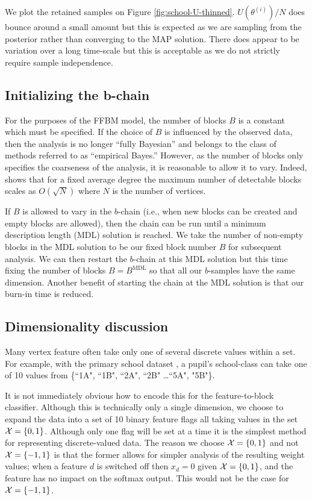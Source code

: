 We plot the retained samples on Figure \ref{fig:school-U-thinned}. $U(\theta^{(i)})/N$ does bounce around a small amount but this is expected as we are sampling from the posterior rather than converging to the MAP solution. There does appear to be variation over a long time-scale but this is acceptable as we do not strictly require sample independence.
\FloatBarrier
\subsection{Initializing the b-chain}

For the purposes of the FFBM model, the number of blocks $B$ is a constant 
which must be specified. If the choice of $B$ is influenced 
by the observed data, then the analysis is no longer ``fully Bayesian''
and belongs to the class of methods referred to as ``empirical Bayes.''
However, as the number of blocks only specifies the coarseness of the 
analysis, it is reasonable to allow it to vary. Indeed, 
\citet{peixoto-determine-B} shows that for a fixed 
average degree the maximum number of detectable blocks scales 
as $O(\sqrt{N})$ where $N$ is the number of vertices.

If $B$ is allowed to vary in the $b$-chain (i.e.,
when new blocks can be created and empty blocks are allowed),
then the chain can be run until a minimum description 
length (MDL) solution is reached. We take the number of non-empty blocks 
in the MDL solution to be our fixed block number $B$ for subsequent analysis. 
We can then restart the $b$-chain at this MDL solution 
but this time fixing the number of blocks $B=B^{\textrm{MDL}}$ so that all our $b$-samples have the same dimension.
Another benefit of starting the chain at the MDL solution is that our burn-in time is reduced.

\subsection{Dimensionality discussion}
\label{appdx:dimension}

Many vertex feature often take only one of several discrete values within a set. For example, with the primary school dataset \cite{schools}, a pupil's school-class can take one of 10 values from \{``1A", ``1B", ``2A", ``2B" \dots ``5A", "5B"\}.

It is not immediately obvious how to encode this for the feature-to-block classifier. Although this is technically only a single dimension, we choose to expand the data into a set of 10 binary feature flags all taking values in the set $\mathcal{X} = \{0, 1\}$. Although only one flag will be set at a time it is the simplest method for representing discrete-valued data. The reason we choose $\mathcal{X}=\{0, 1\}$ and not $\mathcal{X} = \{-1, 1\}$ is that the former allows for simpler analysis of the resulting weight values; when a feature $d$ is switched off then $x_{d}=0$ given $\mathcal{X} = \{0, 1\}$, and the feature has no impact on the softmax output. This would not be the case for $\mathcal{X} = \{-1, 1\}$.


